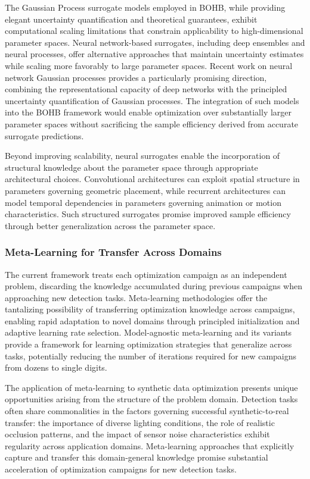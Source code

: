 The Gaussian Process surrogate models employed in BOHB, while providing elegant uncertainty quantification and theoretical guarantees, exhibit computational scaling limitations that constrain applicability to high-dimensional parameter spaces. Neural network-based surrogates, including deep ensembles and neural processes, offer alternative approaches that maintain uncertainty estimates while scaling more favorably to large parameter spaces. Recent work on neural network Gaussian processes provides a particularly promising direction, combining the representational capacity of deep networks with the principled uncertainty quantification of Gaussian processes. The integration of such models into the BOHB framework would enable optimization over substantially larger parameter spaces without sacrificing the sample efficiency derived from accurate surrogate predictions.

Beyond improving scalability, neural surrogates enable the incorporation of structural knowledge about the parameter space through appropriate architectural choices. Convolutional architectures can exploit spatial structure in parameters governing geometric placement, while recurrent architectures can model temporal dependencies in parameters governing animation or motion characteristics. Such structured surrogates promise improved sample efficiency through better generalization across the parameter space.

\subsubsection{Meta-Learning for Transfer Across Domains}
\label{subsubsec:metalearning}

The current framework treats each optimization campaign as an independent problem, discarding the knowledge accumulated during previous campaigns when approaching new detection tasks. Meta-learning methodologies offer the tantalizing possibility of transferring optimization knowledge across campaigns, enabling rapid adaptation to novel domains through principled initialization and adaptive learning rate selection. Model-agnostic meta-learning and its variants provide a framework for learning optimization strategies that generalize across tasks, potentially reducing the number of iterations required for new campaigns from dozens to single digits.

The application of meta-learning to synthetic data optimization presents unique opportunities arising from the structure of the problem domain. Detection tasks often share commonalities in the factors governing successful synthetic-to-real transfer: the importance of diverse lighting conditions, the role of realistic occlusion patterns, and the impact of sensor noise characteristics exhibit regularity across application domains. Meta-learning approaches that explicitly capture and transfer this domain-general knowledge promise substantial acceleration of optimization campaigns for new detection tasks.

